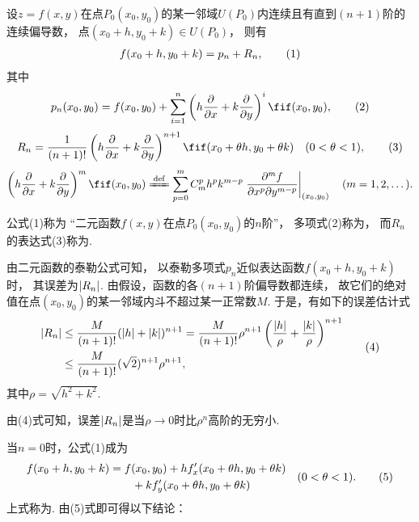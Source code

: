 \begin{theorem}\label{theorem:多元函数微分法.二元函数的泰勒公式}
\def\oprt#1{%
	\left(h\pdv{x}+k\pdv{y}\right)%
	\ifx\relax#1\relax\else\ifnum1=0#1\relax\else^{#1}\fi\fi%
}
设\(z=f(x,y)\)在点\(P_0(x_0,y_0)\)的某一邻域\(U(P_0)\)内连续且有直到\((n+1)\)阶的连续偏导数，
点\((x_0+h,y_0+k) \in U(P_0)\)，
则有\begin{gather}
	f(x_0+h,y_0+k) = p_n + R_n,
	\tag1
\end{gather}
其中\begin{gather}\label{equation:多元函数微分法.二元函数的泰勒多项式}
	p_n(x_0,y_0)
	=f(x_0,y_0)
	+ \sum_{i=1}^n \oprt{i} f(x_0,y_0),
	\tag2
\end{gather}
\begin{gather}\label{equation:多元函数微分法.二元函数的泰勒公式的拉格朗日型余项}
	R_n = \frac{1}{(n+1)!} \oprt{n+1} f(x_0+\theta h,y_0+\theta k)
	\quad (0 < \theta < 1),
	\tag3
\end{gather}
\[
	\oprt{m} f(x_0,y_0)
	\defeq
	\sum_{p=0}^{m} C_m^p h^p k^{m-p}
		\eval{
			\frac{\partial^m f}{\partial x^p \partial y^{m-p}}
		}_{(x_0,y_0)}
	\quad(m=1,2,\dotsc).
\]

\rm
公式(1)称为
“二元函数\(f(x,y)\)在点\(P_0(x_0,y_0)\)的\(n\)阶”，
多项式(2)称为，
而\(R_n\)的表达式(3)称为.
\end{theorem}
由二元函数的泰勒公式可知，
以泰勒多项式\(p_n\)近似表达函数\(f(x_0+h,y_0+k)\)时，
其误差为\(\abs{R_n}\).
由假设，函数的各\((n+1)\)阶偏导数都连续，
故它们的绝对值在点\((x_0,y_0)\)的某一邻域内斗不超过某一正常数\(M\).
于是，有如下的误差估计式\begin{gather}
	\begin{split}
		\abs{R_n}
		&\leq \frac{M}{(n+1)!} (\abs{h}+\abs{k})^{n+1}
		= \frac{M}{(n+1)!} \rho^{n+1}
			\left( \frac{\abs{h}}{\rho} + \frac{\abs{k}}{\rho} \right)^{n+1} \\
		&\leq \frac{M}{(n+1)!} (\sqrt{2})^{n+1} \rho^{n+1},
	\end{split}
	\tag4
\end{gather}其中\(\rho=\sqrt{h^2+k^2}\).

由(4)式可知，误差\(\abs{R_n}\)是当\(\rho\to0\)时比\(\rho^n\)高阶的无穷小.

当\(n=0\)时，公式(1)成为
\begin{gather}\label{equation:多元函数微分法.二元函数的拉格朗日中值公式}
	\begin{split}
		f(x_0+h,y_0+k)
		&=f(x_0,y_0)
		+h f'_x(x_0+\theta h,y_0+\theta k) \\
		&\hspace{20pt}+k f'_y(x_0+\theta h,y_0+\theta k)
	\end{split}
	\quad(0<\theta<1).
	\tag5
\end{gather}上式称为.
由(5)式即可得以下结论：

